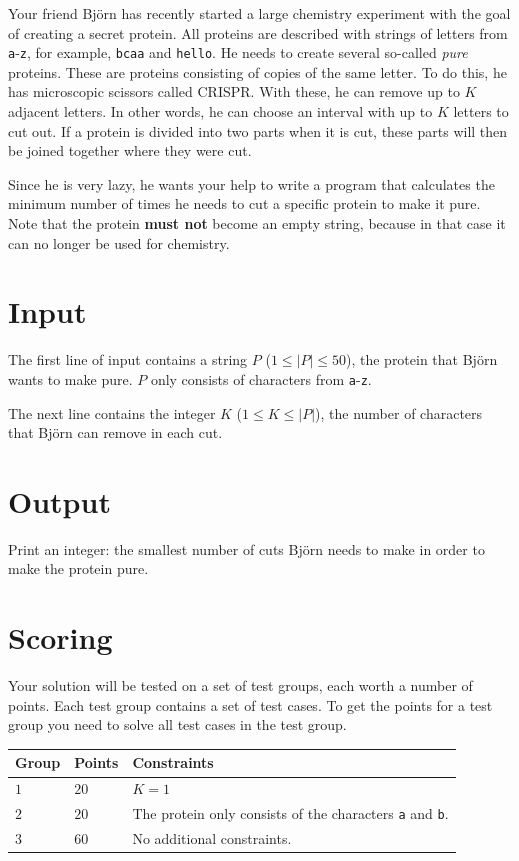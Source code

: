 \noindent

Your friend Björn has recently started a large chemistry experiment with the
goal of creating a secret protein. All proteins are described with strings
of letters from \texttt{a}-\texttt{z}, for example, \texttt{bcaa} and
\texttt{hello}. He needs to create several so-called \textit{pure} proteins.
These are proteins consisting of copies of the same letter. To do this, he has
microscopic scissors called CRISPR. With these, he can remove up to $K$
adjacent letters. In other words, he can choose an interval with up to $K$
letters to cut out. If a protein is divided into two parts when it is cut,
these parts will then be joined together where they were cut.

Since he is very lazy, he wants your help to write a program that calculates
the minimum number of times he needs to cut a specific protein to make it pure.
Note that the protein \textbf{must not} become an empty string, because in that
case it can no longer be used for chemistry.

\section*{Input}
The first line of input contains a string $P$ ($1 \leq |P| \leq 50$), the protein
that Björn wants to make pure. $P$ only consists of characters from \texttt{a}-\texttt{z}.

The next line contains the integer $K$ ($1 \leq K \leq |P|$), the number of characters
that Björn can remove in each cut.

\section*{Output}
Print an integer: the smallest number of cuts Björn needs to make in order to make the protein pure.

\section*{Scoring}
Your solution will be tested on a set of test groups, each worth a number of points. Each test group contains
a set of test cases. To get the points for a test group you need to solve all test cases in the test group.

\noindent
\begin{tabular}{| l | l | p{12cm} |}
  \hline
  \textbf{Group} & \textbf{Points} & \textbf{Constraints} \\ \hline
  $1$    & $20$       & $K=1$ \\ \hline
  $2$    & $20$       & The protein only consists of the characters \texttt{a} and \texttt{b}. \\ \hline
  $3$    & $60$       & No additional constraints. \\ \hline
\end{tabular}

